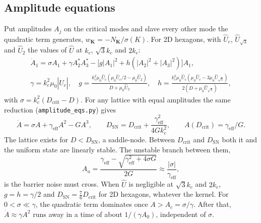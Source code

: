 \documentclass[11pt]{article}
\newcommand{\code}[1]{\texttt{#1}}
\newcommand{\Uh}{\hat U}
\newcommand{\Dc}{D_{\mathrm{crit}}}
\newcommand{\Dsn}{D_{\mathrm{SN}}}
\begin{document}
\subsection{Amplitude equations}
Put amplitudes $A_j$ on the critical modes and slave every other mode the
quadratic term generates, $w_{\mathbf K}=-N_{\mathbf K}/\sigma(K)$. For 2D
hexagons, with $\Uh_c$, $\Uh_{\sqrt3}$ and $\Uh_2$ the values of $\Uh$ at
$k_c$, $\sqrt3k_c$ and $2k_c$:
\begin{gather}
  \dot A_1 = \sigma A_1 + \gamma A_2^*A_3^* - \bigl[g|A_1|^2 + h(|A_2|^2+|A_3|^2)\bigr]A_1, \\
  \gamma = k_c^2\mu_0|\Uh_c|, \quad
  g = \frac{k_c^2\mu_0\Uh_c(\mu_0\Uh_c/2-\mu_0\Uh_2)}{D+\mu_0\Uh_2}, \quad
  h = \frac{k_c^2\mu_0\Uh_c(\mu_0\Uh_c-3\mu_0\Uh_{\sqrt3})}{2(D+\mu_0\Uh_{\sqrt3})},
\end{gather}
with $\sigma=k_c^2(\Dc-D)$. For any lattice with equal amplitudes the same
reduction (\code{amplitude\_eqs.py}) gives
\begin{equation}
  \dot A = \sigma A + \gamma_{\mathrm{eff}}A^2 - GA^3, \qquad
  \Dsn = \Dc + \frac{\gamma_{\mathrm{eff}}^2}{4Gk_c^2}, \qquad
  A(\Dc) = \gamma_{\mathrm{eff}}/G .
\end{equation}
The lattice exists for $D<\Dsn$, a saddle-node. Between $\Dc$ and $\Dsn$ both
it and the uniform state are linearly stable. The unstable branch between them,
\begin{equation}
  A_u = \frac{\gamma_{\mathrm{eff}} - \sqrt{\gamma_{\mathrm{eff}}^2+4\sigma G}}{2G}
      \approx \frac{|\sigma|}{\gamma_{\mathrm{eff}}} ,
\end{equation}
is the barrier noise must cross. When $\Uh$ is negligible at $\sqrt3k_c$ and
$2k_c$, $g=h=\gamma/2$ and $\Dsn=\tfrac76\Dc$ for 2D hexagons, whatever the
kernel. For $0<\sigma\ll\gamma$, the quadratic term dominates once
$A>A_c=\sigma/\gamma$. After that, $\dot A\approx\gamma A^2$ runs away in a
time of about $1/(\gamma A_0)$, independent of $\sigma$.
\end{document}
